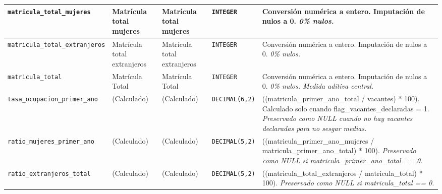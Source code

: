 {\begin{longtable}{|p{3.0cm}|p{2.0cm}|p{2.0cm}|p{1.6cm}|p{6.4cm}|}
\hline
\texttt{\footnotesize matricula\_total\_mujeres} & Matrícula total mujeres & Matrícula total mujeres & \texttt{\footnotesize INTEGER} & Conversión numérica a entero. Imputación de nulos a 0. \newline \textit{\footnotesize 0\% nulos.} \\
\hline
\texttt{\footnotesize matricula\_total\_extranjeros} & Matrícula total extranjeros & Matrícula total extranjeros & \texttt{\footnotesize INTEGER} & Conversión numérica a entero. Imputación de nulos a 0. \newline \textit{\footnotesize 0\% nulos.} \\
\hline
\texttt{\footnotesize matricula\_total} & Matrícula Total & Matrícula Total & \texttt{\footnotesize INTEGER} & Conversión numérica a entero. Imputación de nulos a 0. \newline \textit{\footnotesize 0\% nulos. Medida aditiva central.} \\
\hline
\texttt{\footnotesize tasa\_ocupacion\_primer\_ano} & (Calculado) & (Calculado) & \texttt{\footnotesize DECIMAL(6,2)} & ((matricula\_primer\_ano\_total / vacantes) * 100). Calculado solo cuando flag\_vacantes\_declaradas = 1. \newline \textit{\footnotesize Preservado como NULL cuando no hay vacantes declaradas para no sesgar medias.} \\
\hline
\texttt{\footnotesize ratio\_mujeres\_primer\_ano} & (Calculado) & (Calculado) & \texttt{\footnotesize DECIMAL(5,2)} & ((matricula\_primer\_ano\_mujeres / matricula\_primer\_ano\_total) * 100). \newline \textit{\footnotesize Preservado como NULL si matricula\_primer\_ano\_total == 0.} \\
\hline
\texttt{\footnotesize ratio\_extranjeros\_total} & (Calculado) & (Calculado) & \texttt{\footnotesize DECIMAL(5,2)} & ((matricula\_total\_extranjeros / matricula\_total) * 100). \newline \textit{\footnotesize Preservado como NULL si matricula\_total == 0.} \\
\hline
\end{longtable}
}
